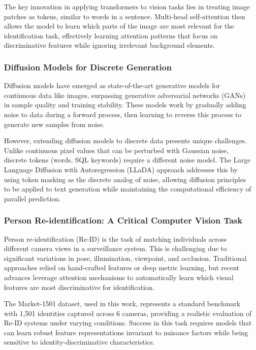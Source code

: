 \documentclass[a4paper,12pt]{article}
\begin{document}
The key innovation in applying transformers to vision tasks lies in treating image patches as tokens, similar to words in a sentence. Multi-head self-attention then allows the model to learn which parts of the image are most relevant for the identification task, effectively learning attention patterns that focus on discriminative features while ignoring irrelevant background elements.

\subsubsection{Diffusion Models for Discrete Generation}

Diffusion models have emerged as state-of-the-art generative models for continuous data like images, surpassing generative adversarial networks (GANs) in sample quality and training stability. These models work by gradually adding noise to data during a forward process, then learning to reverse this process to generate new samples from noise.

However, extending diffusion models to discrete data presents unique challenges. Unlike continuous pixel values that can be perturbed with Gaussian noise, discrete tokens (words, SQL keywords) require a different noise model. The Large Language Diffusion with Autoregression (LLaDA) approach addresses this by using token masking as the discrete analog of noise, allowing diffusion principles to be applied to text generation while maintaining the computational efficiency of parallel prediction.

\subsubsection{Person Re-identification: A Critical Computer Vision Task}

Person re-identification (Re-ID) is the task of matching individuals across different camera views in a surveillance system. This is challenging due to significant variations in pose, illumination, viewpoint, and occlusion. Traditional approaches relied on hand-crafted features or deep metric learning, but recent advances leverage attention mechanisms to automatically learn which visual features are most discriminative for identification.

The Market-1501 dataset, used in this work, represents a standard benchmark with 1,501 identities captured across 6 cameras, providing a realistic evaluation of Re-ID systems under varying conditions. Success in this task requires models that can learn robust feature representations invariant to nuisance factors while being sensitive to identity-discriminative characteristics.
\end{document}

